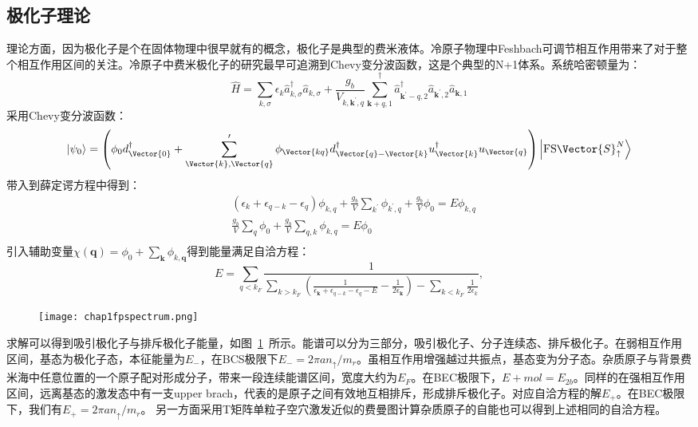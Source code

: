 \subsection{极化子理论}
理论方面，因为极化子是个在固体物理中很早就有的概念，极化子是典型的费米液体。冷原子物理中Feshbach可调节相互作用带来了对于整个相互作用区间的关注。冷原子中费米极化子的研究最早可追溯到Chevy变分波函数\cite{chevy2006}，这是个典型的N+1体系。系统哈密顿量为：
\begin{equation}
\hat{H}=\sum_{k, \sigma} \epsilon_{k} \hat{a}_{k, \sigma}^{\dagger} \hat{a}_{k, \sigma}+\frac{g_{b}}{V_{k, \boldsymbol{k}^{\prime}, q}} \sum_{\boldsymbol{k}+q, 1}^{\dagger} \hat{a}_{\boldsymbol{k}^{\prime}-q, 2}^{\dagger} \hat{a}_{\boldsymbol{k}^{\prime}, 2} \hat{a}_{\boldsymbol{k}, 1}
\end{equation}
采用Chevy变分波函数：
\begin{equation}
\left|\psi_{0}\right\rangle=\left(\phi_{0} d_{\Vector{0}}^{\dagger}+\sum_{\Vector{k}, \Vector{q}}^{\prime} \phi_{\Vector{k q}} d_{\Vector{q}-\Vector{k}}^{\dagger} u_{\Vector{k}}^{\dagger} u_{\Vector{q}}\right)\left|\mathrm{FS} \Vector{S}_{\uparrow}^{N}\right\rangle
\end{equation}
带入到薛定谔方程中得到：
\begin{equation}
\begin{split}
&\left(\epsilon_{k}+\epsilon_{q-k}-\epsilon_{q}\right) \phi_{k, q}+\frac{g_{b}}{V} \sum_{k^{\prime}} \phi_{k^{\prime}, q}+\frac{g_{b}}{V} \phi_{0}=E \phi_{k, q}\\
&\frac{g_{b}}{V} \sum_{q} \phi_{0}+\frac{g_{b}}{V} \sum_{q, k} \phi_{k, q}=E \phi_{0}\\
\end{split}
\end{equation}
引入辅助变量$\chi(\boldsymbol{q})=\phi_{0}+\sum_{\boldsymbol{k}} \phi_{k, \boldsymbol{q}}$得到能量满足自洽方程：
\begin{equation}
E=\sum_{q<k_{F}} \frac{1}{\sum_{k>k_{F}}\left(\frac{1}{\epsilon_{\boldsymbol{k}}+\epsilon_{q-k}-\epsilon_{q}-E}-\frac{1}{2 \epsilon_{\boldsymbol{k}}}\right)-\sum_{k<k_{F}} \frac{1}{2 \epsilon_{k}}},
\end{equation}
\begin{figure}[!htbp]
    \centering
    \texttt{[image: chap1fpspectrum.png]}
    \label{fpchevyE}
\end{figure}
求解可以得到吸引极化子与排斥极化子能量，如图~\ref{fpchevyE}~所示。能谱可以分为三部分，吸引极化子、分子连续态、排斥极化子。在弱相互作用区间，基态为极化子态，本征能量为$E_-$，在BCS极限下$E_{-}=2 \pi a n_{\uparrow} / m_{r}$。虽相互作用增强越过共振点，基态变为分子态。杂质原子与背景费米海中任意位置的一个原子配对形成分子，带来一段连续能谱区间，宽度大约为$E_F$。在BEC极限下，$E+{mol}=E_{2b}$。同样的在强相互作用区间，远离基态的激发态中有一支upper brach，代表的是原子之间有效地互相排斥，形成排斥极化子。对应自洽方程的解$E_+$。在BEC极限下，我们有$E_{+}=2 \pi a n_{\uparrow} / m_{r}$。
另一方面采用T矩阵单粒子空穴激发近似的费曼图计算杂质原子的自能也可以得到上述相同的自洽方程\cite{Combescot20071ph}。

